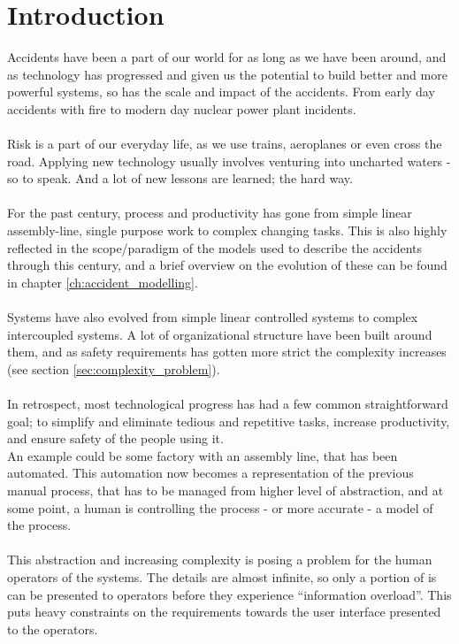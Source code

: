 \documentclass[10pt,oneside]{book}                  %
\begin{document}
\chapter{Introduction}
Accidents have been a part of our world for as long as we have been around, and as technology has progressed and given us the potential to build better and more powerful systems, so has the scale and impact of the accidents. From early day accidents with fire to modern day nuclear power plant incidents.\\
\\
Risk is a part of our everyday life, as we use trains, aeroplanes or even cross the road. Applying new technology usually involves venturing into uncharted waters - so to speak. And a lot of new lessons are learned; the hard way.\\
\\
For the past century, process and productivity has gone from simple linear assembly-line, single purpose work to complex changing tasks. This is also highly reflected in the scope/paradigm of the models used to describe the accidents through this century, and a brief overview on the evolution of these can be found in chapter \ref{ch:accident_modelling}.\\
\\
Systems have also evolved from simple linear controlled systems to complex intercoupled systems. A lot of organizational structure have been built around them, and as safety requirements has gotten more strict the complexity increases (see section \ref{sec:complexity_problem}).\\
\\
In retrospect, most technological progress has had a few common straightforward goal; to simplify and eliminate tedious and repetitive tasks, increase productivity, and ensure safety of the people using it.\\
An example could be some factory with an assembly line, that has been automated. This automation now becomes a representation of the previous manual process, that has to be managed from higher level of abstraction, and at some point, a human is controlling the process - or more accurate - a model of the process.\\
\\
This abstraction and increasing complexity is posing a problem for the human operators of the systems. The details are almost infinite, so only a portion of is can be presented to operators before they experience ``information overload''. This puts heavy constraints on the requirements towards the user interface presented to the operators.\\
\end{document}
